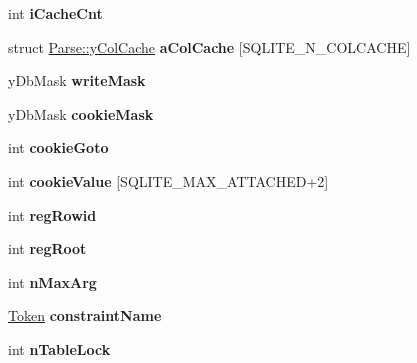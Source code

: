 \begin{DoxyCompactItemize}
\item 
\hypertarget{struct_parse_ac4633493fd5f100fa823344be1c19d1e}{int {\bfseries i\-Cache\-Cnt}}\label{struct_parse_ac4633493fd5f100fa823344be1c19d1e}

\item 
\hypertarget{struct_parse_a788b85979d58b84e06bc367bac5b3f3f}{struct \hyperlink{struct_parse_1_1y_col_cache}{Parse\-::y\-Col\-Cache} {\bfseries a\-Col\-Cache} \mbox{[}S\-Q\-L\-I\-T\-E\-\_\-\-N\-\_\-\-C\-O\-L\-C\-A\-C\-H\-E\mbox{]}}\label{struct_parse_a788b85979d58b84e06bc367bac5b3f3f}

\item 
\hypertarget{struct_parse_a4939b6d4fd3f48731b58b8a6f51417cd}{y\-Db\-Mask {\bfseries write\-Mask}}\label{struct_parse_a4939b6d4fd3f48731b58b8a6f51417cd}

\item 
\hypertarget{struct_parse_a7c0b37cf797fd157234cb2e306cba2e4}{y\-Db\-Mask {\bfseries cookie\-Mask}}\label{struct_parse_a7c0b37cf797fd157234cb2e306cba2e4}

\item 
\hypertarget{struct_parse_a38a03495b8b18e86c2855c70b717d921}{int {\bfseries cookie\-Goto}}\label{struct_parse_a38a03495b8b18e86c2855c70b717d921}

\item 
\hypertarget{struct_parse_a6023169734f87ce27a760e0f9026c381}{int {\bfseries cookie\-Value} \mbox{[}S\-Q\-L\-I\-T\-E\-\_\-\-M\-A\-X\-\_\-\-A\-T\-T\-A\-C\-H\-E\-D+2\mbox{]}}\label{struct_parse_a6023169734f87ce27a760e0f9026c381}

\item 
\hypertarget{struct_parse_a63f71c268a7a77cb0df5619dd8ebbacd}{int {\bfseries reg\-Rowid}}\label{struct_parse_a63f71c268a7a77cb0df5619dd8ebbacd}

\item 
\hypertarget{struct_parse_afcf3d47e9424b79e6911cf366cb73bd4}{int {\bfseries reg\-Root}}\label{struct_parse_afcf3d47e9424b79e6911cf366cb73bd4}

\item 
\hypertarget{struct_parse_aab781bff62f93c0f9a7ca979a3b3a820}{int {\bfseries n\-Max\-Arg}}\label{struct_parse_aab781bff62f93c0f9a7ca979a3b3a820}

\item 
\hypertarget{struct_parse_a40cbce90eedbd57143416c8bc28fec46}{\hyperlink{struct_token}{Token} {\bfseries constraint\-Name}}\label{struct_parse_a40cbce90eedbd57143416c8bc28fec46}

\item 
\hypertarget{struct_parse_a8c61b1b13dcb394b190fa09f5c253928}{int {\bfseries n\-Table\-Lock}}\label{struct_parse_a8c61b1b13dcb394b190fa09f5c253928}


\end{DoxyCompactItemize}
